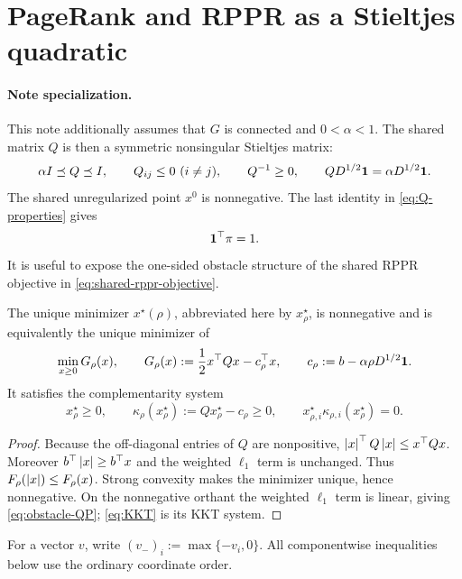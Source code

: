 \section{PageRank and RPPR as a Stieltjes quadratic}
\label{sec:model}



\paragraph{Note specialization.}
This note additionally assumes that \(G\) is connected and
\(0<\alpha<1\). The shared matrix \(Q\) is then a symmetric nonsingular
Stieltjes matrix:
\begin{equation}
  \alpha I\preceq Q\preceq I,
  \qquad Q_{ij}\leq0\ (i\neq j),
  \qquad Q^{-1}\geq0,
  \qquad QD^{1/2}\mathbf{1}=\alpha D^{1/2}\mathbf{1}.
  \label{eq:Q-properties}
\end{equation}
The shared unregularized point \(x^0\) is nonnegative. The last identity in
\cref{eq:Q-properties} gives
\begin{equation}
  \mathbf{1}^\top\pi=1.
  \label{eq:ppr-mass}
\end{equation}
It is useful to expose the one-sided obstacle structure of the shared RPPR
objective in \cref{eq:shared-rppr-objective}.

\begin{lemma}
\label{lem:nonnegative-equivalence}
The unique minimizer \(x^\star(\rho)\), abbreviated here by
\(x_\rho^\star\), is nonnegative and is
equivalently the unique minimizer of
\begin{equation}
  \min_{x\geq0}G_\rho(x),
  \qquad
  G_\rho(x):=\frac12x^\top Qx-c_\rho^\top x,
  \qquad
  c_\rho:=b-\alpha\rho D^{1/2}\mathbf{1}.
  \label{eq:obstacle-QP}
\end{equation}
It satisfies the complementarity system
\begin{equation}
 x_\rho^\star\geq0,
 \qquad
 \kappa_\rho(x_\rho^\star):=Qx_\rho^\star-c_\rho\geq0,
 \qquad
 x_{\rho,i}^\star \kappa_{\rho,i}(x_\rho^\star)=0.
 \label{eq:KKT}
\end{equation}
\end{lemma}

\begin{proof}
Because the off-diagonal entries of $Q$ are nonpositive,
$\left\lvert x \right\rvert^\top Q\left\lvert x \right\rvert\leq x^\top Qx$.  Moreover
$b^\top\left\lvert x \right\rvert\geq b^\top x$ and the weighted $\ell_1$ term is unchanged.
Thus $F_\rho(\left\lvert x \right\rvert)\leq F_\rho(x)$.  Strong convexity makes the minimizer
unique, hence nonnegative.  On the nonnegative orthant the weighted
$\ell_1$ term is linear, giving \cref{eq:obstacle-QP};
\cref{eq:KKT} is its KKT system.
\end{proof}

For a vector $v$, write $(v_-)_i:=\max\{-v_i,0\}$.  All componentwise
inequalities below use the ordinary coordinate order.
